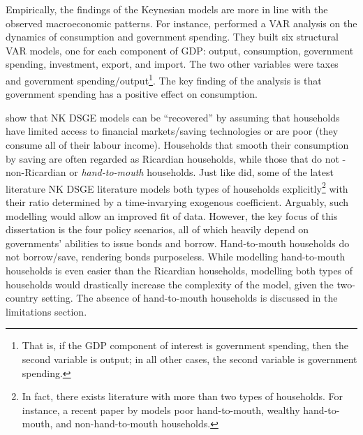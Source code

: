 Empirically, the findings of the Keynesian models are more in line with the observed macroeconomic patterns. For instance, \textcite{blanchard_2002_an} performed a VAR analysis on the dynamics of consumption and government spending. They built six structural VAR models, one for each component of GDP: output, consumption, government spending, investment, export, and import. The two other variables were taxes and government spending/output\footnote{That is, if the GDP component of interest is government spending, then the second variable is output; in all other cases, the second variable is government spending.}. The key finding of the analysis is that government spending has a positive effect on consumption. 

\textcite{jordigal_2005_understanding} show that NK DSGE models can be ``recovered'' by assuming that households have limited access to financial markets/saving technologies or are poor (they consume all of their labour income). Households that smooth their consumption by saving are often regarded as Ricardian households, while those that do not - non-Ricardian or \textit{hand-to-mouth} households. Just like \textcite{jordigal_2005_understanding} did, some of the latest literature NK DSGE literature models both types of households explicitly\footnote{In fact, there exists literature with more than two types of households. For instance, a recent paper by \textcite{eskelinen_2021_monetary} models poor hand-to-mouth, wealthy hand-to-mouth, and non-hand-to-mouth households.} with their ratio determined by a time-invarying exogenous coefficient. Arguably, such modelling would allow an improved fit of data. However, the key focus of this dissertation is the four policy scenarios, all of which heavily depend on governments' abilities to issue bonds and borrow. Hand-to-mouth households do not borrow/save, rendering bonds purposeless. While modelling hand-to-mouth households is even easier than the Ricardian households, modelling both types of households would drastically increase the complexity of the model, given the two-country setting. The absence of hand-to-mouth households is discussed in the limitations section.